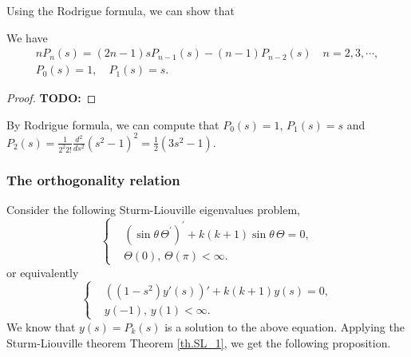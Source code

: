 Using the Rodrigue formula, we can show that 
\begin{proposition} We have
\begin{equation}\label{eq.Legendre_recursion}
\begin{gathered}
    n P_n(s)=(2 n-1) s P_{n-1}(s)-(n-1) P_{n-2}(s) \quad n=2,3, \cdots, 
    \\ 
    P_0(s)=1, \quad P_1(s)=s .
\end{gathered}
\end{equation}
\end{proposition}
\begin{proof}
    \textbf{TODO: }
\end{proof}

\begin{example}[] By Rodrigue formula, we can compute that $P_0(s) = 1$, $P_1(s) = s$ and $P_2(s) = \frac{1}{2^2 2!}\frac{d^2}{ds^2} (s^2 - 1)^2 = \frac{1}{2}(3s^2 - 1)$.
\end{example}


\subsubsection{The orthogonality relation}
Consider the following Sturm-Liouville eigenvalues problem,
\begin{equation}\label{eq.Legendre_SL_problem}
\left\{
\begin{aligned}
    &(\sin\theta\,\Theta^{\prime})^{\prime}+k(k+1) \sin\theta\,\Theta=0, 
    \\
    &\Theta(0),\, \Theta(\pi)  < \infty.
\end{aligned}
\right.
\end{equation}
or equivalently
\begin{equation}\label{eq.Legendre_SL_problem'}
\left\{
\begin{aligned}
    &((1-s^2)y'(s))' + k(k+1) y(s) = 0, 
    \\
    &y(-1),\, y(1)  < \infty.
\end{aligned}
\right.
\end{equation}
We know that $y(s) = P_k(s)$ is a solution to the above equation. Applying the Sturm-Liouville theorem Theorem \ref{th.SL_1}, we get the following proposition.

